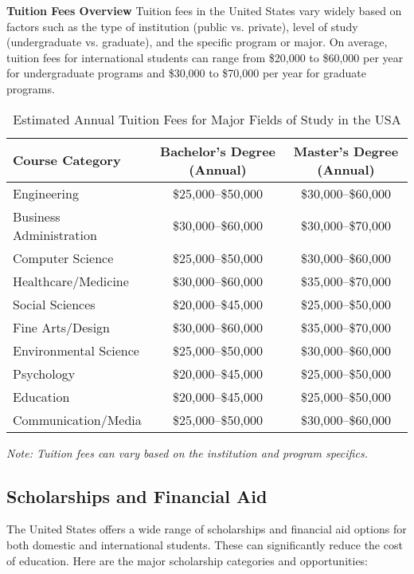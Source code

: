 \textbf{Tuition Fees Overview}
Tuition fees in the United States vary widely based on factors such as the type of institution (public vs. private), level of study (undergraduate vs. graduate), and the specific program or major. On average, tuition fees for international students can range from \$20,000 to \$60,000 per year for undergraduate programs and \$30,000 to \$70,000 per year for graduate programs.
\begin{table}[h!]
\centering
\begin{tabular}{|l|c|c|}
\hline
\textbf{Course Category} & \textbf{Bachelor's Degree (Annual)} & \textbf{Master's Degree (Annual)} \\
\hline
Engineering & \$25,000--\$50,000 & \$30,000--\$60,000 \\
Business Administration & \$30,000--\$60,000 & \$30,000--\$70,000 \\
Computer Science & \$25,000--\$50,000 & \$30,000--\$60,000 \\
Healthcare/Medicine & \$30,000--\$60,000 & \$35,000--\$70,000 \\
Social Sciences & \$20,000--\$45,000 & \$25,000--\$50,000 \\
Fine Arts/Design & \$30,000--\$60,000 & \$35,000--\$70,000 \\
Environmental Science & \$25,000--\$50,000 & \$30,000--\$60,000 \\
Psychology & \$20,000--\$45,000 & \$25,000--\$50,000 \\
Education & \$20,000--\$45,000 & \$25,000--\$50,000 \\
Communication/Media & \$25,000--\$50,000 & \$30,000--\$60,000 \\
\hline
\end{tabular}
\caption{Estimated Annual Tuition Fees for Major Fields of Study in the USA}
\end{table}

\textit{Note: Tuition fees can vary based on the institution and program specifics.}

\subsection{Scholarships and Financial Aid}
The United States offers a wide range of scholarships and financial aid options for both domestic and international students. These can significantly reduce the cost of education. Here are the major scholarship categories and opportunities:

